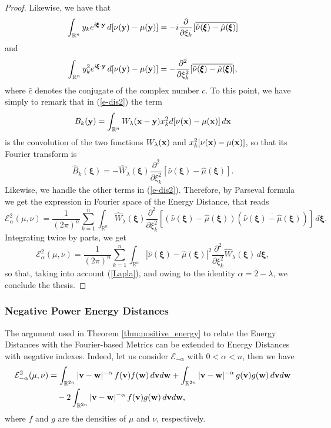 \documentclass{article}
\newcommand{\bv}{\mathrm{BV}}
\newcommand{\fer}[1]{(\ref{#1})}
\newcommand{\R}{\mathbb R}
\def\R{\mathbb{R}}
\def\bx{{\bf x}}
\def\by{{\bf y}}
\def\bv{{\bf v}}
\def\bw{{\bf w}}
\def\bxi{{\pmb\xi}}
\newtheorem{proof}{Proof}
\begin{document}
\begin{proof}
    Likewise, we have that
    \[
    \int_{\R^n} y_k e^{i\bxi\cdot\by} \, d[\nu(\by)-\mu(\by)] = -i \frac{\partial}{\partial \xi_k}[\overline{\hat\nu(\bxi)-\hat\mu(\bxi)}]
    \]
    and
    \[
    \int_{\R^n} y_k^2 e^{i\bxi\cdot\by} \, d[\nu(\by)-\mu(\by)] = - \frac{\partial^2}{\partial \xi_k^2}[\overline{\hat\nu(\bxi)-\hat\mu(\bxi)}],
    \]
    where $\bar c$ denotes the conjugate of the complex number $c$. 
    To this point, we have simply to remark that in \fer{e-dis2} the term
    \[
    B_k(\by) = \int_{\R^n}W_{\lambda}(\bx-\by) x_k^2 d[\nu(\bx)-\mu(\bx)] \, d\bx 
    \]
    is the convolution of the two functions $W_{\lambda}(\bx)$ and $x_k^2[\nu(\bx)-\mu(\bx)]$, so that its Fourier transform is 
    \[
    \widehat B_k(\bxi) = -\widehat W_\lambda(\bxi)\frac{\partial^2}{\partial \xi_k^2}[\hat\nu(\bxi)-\hat\mu(\bxi)].
    \]
    Likewise, we handle the other terms in \fer{e-dis2}. 
    Therefore, by Parseval formula we get the expression in Fourier space of the Energy Distance, that reads
    \[
    \mathcal{E}^2_\alpha(\mu,\nu) = \frac 1{(2\pi)^n} \sum_{k=1}^n \int_{\R^n}\widehat W_\lambda(\bxi) \frac{\partial^2}{\partial \xi_k^2}\left[ (\hat\nu(\bxi)-\hat\mu(\bxi))(\overline{\hat\nu(\bxi)-\hat\mu(\bxi)})\right]\, d\bxi.
    \]
    Integrating twice by parts, we get
    \[
    \mathcal{E}^2_\alpha(\mu,\nu)= \frac 1{(2\pi)^n} \sum_{k=1}^n \int_{\R^n} \left|\hat\nu(\bxi)-\hat\mu(\bxi)\right|^2\frac{\partial^2}{\partial \xi_k^2} \widehat W_\lambda(\bxi)\, d\bxi,
    \]
    so that, taking into account \fer{Lapla}, and owing to the identity $\alpha=2-\lambda$, we conclude the thesis.
\end{proof}






\subsubsection{Negative Power Energy Distances}

The argument used in Theorem \ref{thm:positive_energy} to relate the Energy Distances with the Fourier-based Metrics can be extended to Energy Distances with negative indexes.
% 
Indeed, let us consider $\mathcal{E}_{-\alpha}$ with $0 < \alpha < n$, then we have
% 
% 
\begin{align}
    \nonumber\label{eq:negative_power}
    \mathcal{E}^2_{-\alpha}(\mu,\nu)&= \int_{\R^{2n}}|\bv-\bw|^{-\alpha}\, f(\bv) f(\bw)\, d\bv d\bw  + \int_{\R^{2n}}|\bv-\bw|^{-\alpha}\, g(\bv) g(\bw)\, d\bv d\bw \\
&\quad-2\int_{\R^{2n}}|\bv-\bw|^{-\alpha}\, f(\bv) g(\bw)\, d\bv d\bw,
\end{align}
% 
where $f$ and $g$ are the densities of $\mu$ and $\nu$, respectively.
% 
\end{document}
